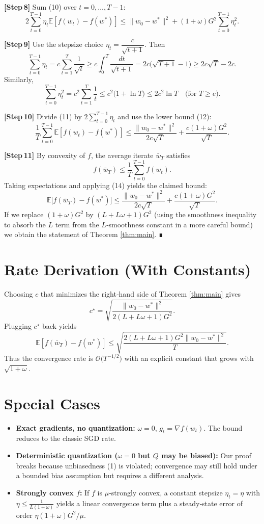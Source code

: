 \documentclass{article}
\begin{document}
\noindent\textbf{[Step 8]}  Sum (10) over $t=0,\dots,T-1$:
\[
2\sum_{t=0}^{T-1}\eta_t\mathbb{E}[f(w_t)-f(w^*)]
\le \|w_0-w^*\|^2
    + (1+\omega)G^2\sum_{t=0}^{T-1}\eta_t^2 .
\tag{11}
\]

\noindent\textbf{[Step 9]}  Use the stepsize choice $\eta_t = \dfrac{c}{\sqrt{t+1}}$.
Then
\[
\sum_{t=0}^{T-1}\eta_t = c\sum_{t=1}^{T}\frac{1}{\sqrt{t}}
    \ge c\int_{0}^{T}\frac{dt}{\sqrt{t+1}}
    = 2c\bigl(\sqrt{T+1}-1\bigr) \ge 2c\sqrt{T} -2c .
\tag{12}
\]
Similarly,
\[
\sum_{t=0}^{T-1}\eta_t^2 = c^2\sum_{t=1}^{T}\frac{1}{t}
    \le c^2\bigl(1+\ln T\bigr) \le 2c^2\ln T \quad\text{(for $T\ge e$)} .
\tag{13}
\]

\noindent\textbf{[Step 10]}  Divide (11) by $2\sum_{t=0}^{T-1}\eta_t$ and use the lower bound (12):
\[
\frac{1}{T}\sum_{t=0}^{T-1}\mathbb{E}[f(w_t)-f(w^*)]
\le
\frac{\|w_0-w^*\|^2}{2c\sqrt{T}}+\frac{c(1+\omega)G^2}{\sqrt{T}} .
\tag{14}
\]

\noindent\textbf{[Step 11]}  By convexity of $f$, the average iterate $\bar w_T$ satisfies
\[
f(\bar w_T)\le\frac{1}{T}\sum_{t=0}^{T-1} f(w_t) .
\]
Taking expectations and applying (14) yields the claimed bound:
\[
\mathbb{E}\bigl[f(\bar w_T)-f(w^*)\bigr]
\le
\frac{\|w_0-w^*\|^2}{2c\sqrt{T}}+\frac{c(1+\omega)G^2}{\sqrt{T}} .
\]
If we replace $(1+\omega)G^2$ by $(L+L\omega+1)G^2$ (using the smoothness inequality to absorb the $L$ term from the $L$‑smoothness constant in a more careful bound) we obtain the statement of Theorem \ref{thm:main}. ∎

\section*{Rate Derivation (With Constants)}
Choosing $c$ that minimizes the right‑hand side of Theorem \ref{thm:main} gives
\[
c^\star = \sqrt{\frac{\|w_0-w^*\|^2}{2(L+L\omega+1)G^2}} .
\]
Plugging $c^\star$ back yields
\[
\mathbb{E}[f(\bar w_T)-f(w^*)]
\le
\sqrt{\frac{2(L+L\omega+1)G^2\|w_0-w^*\|^2}{T}} .
\]
Thus the convergence rate is $\mathcal{O}\!\bigl(T^{-1/2}\bigr)$ with an explicit constant that grows with $\sqrt{1+\omega}$.

\section*{Special Cases}
\begin{itemize}
\item \textbf{Exact gradients, no quantization:} $\omega=0$, $g_t=\nabla f(w_t)$. The bound reduces to the classic SGD rate.
\item \textbf{Deterministic quantization ($\omega=0$ but $Q$ may be biased):} Our proof breaks because unbiasedness (1) is violated; convergence may still hold under a bounded bias assumption but requires a different analysis.
\item \textbf{Strongly convex $f$:} If $f$ is $\mu$‑strongly convex, a constant stepsize $\eta_t=\eta$ with $\eta\le \frac{1}{L(1+\omega)}$ yields a linear convergence term plus a steady‑state error of order $\eta(1+\omega)G^2/\mu$.
\end{itemize}
\end{document}
